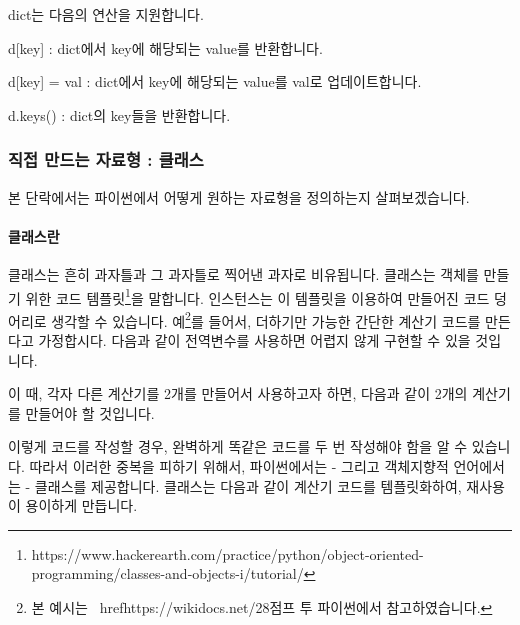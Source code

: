 \documentclass[twoside]{article}
\begin{document}
dict는 다음의 연산을 지원합니다. 
\begin{compactitem} 
\item d[key] : dict에서 key에 해당되는 value를 반환합니다. 
\item d[key] = val : dict에서 key에 해당되는 value를 val로 업데이트합니다. 
\item d.keys() : dict의 key들을 반환합니다. 
\end{compactitem}




                
\subsubsection{직접 만드는 자료형 : 클래스}

본 단락에서는 파이썬에서 어떻게 원하는 자료형을 정의하는지 살펴보겠습니다. 

\paragraph{클래스란} 

클래스는 흔히 과자틀과 그 과자틀로 찍어낸 과자로 비유됩니다. 클래스는 객체를 만들기 위한 코드 템플릿\footnote{https://www.hackerearth.com/practice/python/object-oriented-programming/classes-and-objects-i/tutorial/}을 말합니다. 인스턴스는 이 템플릿을 이용하여 만들어진 코드 덩어리로 생각할 수 있습니다. 예\footnote{본 예시는 \ href{https://wikidocs.net/28}{점프 투 파이썬}에서 참고하였습니다.}를 들어서, 더하기만 가능한 간단한 계산기 코드를 만든다고 가정합시다. 다음과 같이 전역변수를 사용하면 어렵지 않게 구현할 수 있을 것입니다. 



이 때, 각자 다른 계산기를 2개를 만들어서 사용하고자 하면, 다음과 같이 2개의 계산기를 만들어야 할 것입니다.



이렇게 코드를 작성할 경우, 완벽하게 똑같은 코드를 두 번 작성해야 함을 알 수 있습니다. 따라서 이러한 중복을 피하기 위해서, 파이썬에서는 - 그리고 객체지향적 언어에서는 - 클래스를 제공합니다. 클래스는 다음과 같이 계산기 코드를 템플릿화하여, 재사용이 용이하게 만듭니다. 
\end{document}
